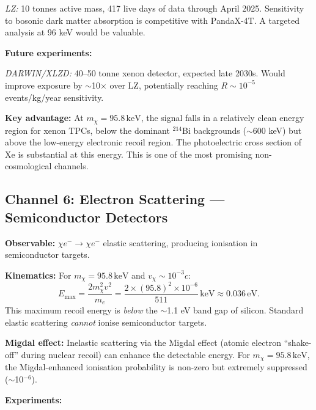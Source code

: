 \documentclass[12pt,a4paper]{article}
\newcommand{\keV}{\,\mathrm{keV}}
\newcommand{\eV}{\,\mathrm{eV}}
\begin{document}
\emph{LZ:} 10 tonnes active mass, 417 live days of data through
April 2025. Sensitivity to bosonic dark matter absorption is
competitive with PandaX-4T. A targeted analysis at 96 keV would
be valuable.

\textbf{Future experiments:}

\emph{DARWIN/XLZD:} 40--50 tonne xenon detector, expected late 2030s.
Would improve exposure by $\sim$10$\times$ over LZ, potentially
reaching $R \sim 10^{-5}$\,events/kg/year sensitivity.

\textbf{Key advantage:} At $m_\chi = 95.8\keV$, the signal falls in a
relatively clean energy region for xenon TPCs, below the dominant
$^{214}$Bi backgrounds ($\sim$600 keV) but above the low-energy
electronic recoil region. The photoelectric cross section of Xe is
substantial at this energy. This is one of the most promising
non-cosmological channels.

\begin{center}
\end{center}

\subsection{Channel 6: Electron Scattering --- Semiconductor Detectors}
\label{sec:electron}

\textbf{Observable:} $\chi e^- \to \chi e^-$ elastic scattering,
producing ionisation in semiconductor targets.

\textbf{Kinematics:} For $m_\chi = 95.8\keV$ and $v_\chi \sim 10^{-3}c$:
\begin{equation}
E_\mathrm{max} = \frac{2 m_\chi^2 v^2}{m_e}
= \frac{2 \times (95.8)^2 \times 10^{-6}}{511}\keV \approx 0.036\eV.
\end{equation}
This maximum recoil energy is \emph{below} the $\sim$1.1 eV band gap
of silicon. Standard elastic scattering \emph{cannot} ionise
semiconductor targets.

\textbf{Migdal effect:} Inelastic scattering via the Migdal effect
(atomic electron ``shake-off'' during nuclear recoil) can enhance the
detectable energy. For $m_\chi = 95.8\keV$, the Migdal-enhanced
ionisation probability is non-zero but extremely suppressed ($\sim$10$^{-6}$).

\textbf{Experiments:}
\end{document}
